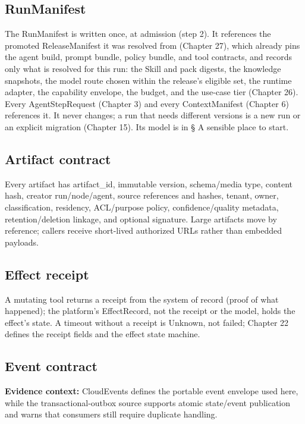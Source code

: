 \subsection{RunManifest}

The RunManifest is written once, at admission (step 2). It references the promoted ReleaseManifest it was resolved from (Chapter 27), which already pins the agent build, prompt bundle, policy bundle, and tool contracts, and records only what is resolved for this run: the Skill and pack digests, the knowledge snapshots, the model route chosen within the release's eligible set, the runtime adapter, the capability envelope, the budget, and the use-case tier (Chapter 26). Every AgentStepRequest (Chapter 3) and every ContextManifest (Chapter 6) references it. It never changes; a run that needs different versions is a new run or an explicit migration (Chapter 15). Its model is in § A sensible place to start.\par

\subsection{Artifact contract}

Every artifact has artifact\_id, immutable version, schema/media type, content hash, creator run/node/agent, source references and hashes, tenant, owner, classification, residency, ACL/purpose policy, confidence/quality metadata, retention/deletion linkage, and optional signature. Large artifacts move by reference; callers receive short-lived authorized URLs rather than embedded payloads.\par

\subsection{Effect receipt}

A mutating tool returns a receipt from the system of record (proof of what happened); the platform's EffectRecord, not the receipt or the model, holds the effect's state. A timeout without a receipt is Unknown, not failed; Chapter 22 defines the receipt fields and the effect state machine.\par

\subsection{Event contract}

\begin{bookquote}

\textbf{Evidence context:} CloudEvents defines the portable event envelope used here, while the transactional-outbox source supports atomic state/event publication and warns that consumers still require duplicate handling. \textbf{}

\end{bookquote}


